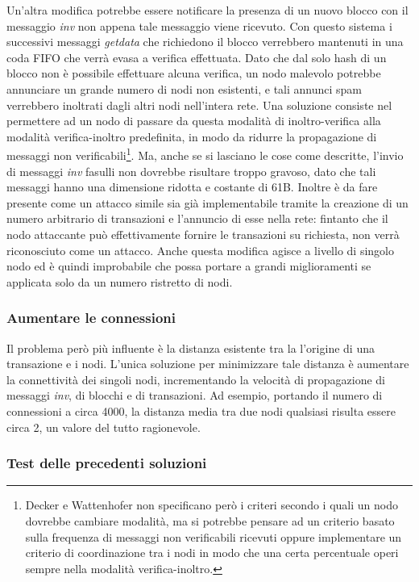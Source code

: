 Un'altra modifica potrebbe essere notificare la presenza di un nuovo blocco con il messaggio \emph{inv} non appena tale messaggio viene ricevuto. Con questo sistema i successivi messaggi \emph{getdata} che richiedono il blocco verrebbero mantenuti in una coda FIFO che verrà evasa a verifica effettuata.
Dato che dal solo hash di un blocco non è possibile effettuare alcuna verifica, un nodo malevolo potrebbe annunciare un grande numero di nodi non esistenti, e tali annunci spam verrebbero inoltrati dagli altri nodi nell'intera rete. Una soluzione consiste nel permettere ad un nodo di passare da questa modalità di inoltro-verifica alla modalità verifica-inoltro predefinita, in modo da ridurre la propagazione di messaggi non verificabili\footnote{Decker e Wattenhofer non specificano però i criteri secondo i quali un nodo dovrebbe cambiare modalità, ma si potrebbe pensare ad un criterio basato sulla frequenza di messaggi non verificabili ricevuti oppure implementare un criterio di coordinazione tra i nodi in modo che una certa percentuale operi sempre nella modalità verifica-inoltro.}.
Ma, anche se si lasciano le cose come descritte, l'invio di messaggi \emph{inv} fasulli non dovrebbe risultare troppo gravoso, dato che tali messaggi hanno una dimensione ridotta e costante di 61B.
Inoltre è da fare presente come un attacco simile sia già implementabile tramite la creazione di un numero arbitrario di transazioni e l'annuncio di esse nella rete: fintanto che il nodo attaccante può effettivamente fornire le transazioni su richiesta, non verrà riconosciuto come un attacco.
Anche questa modifica agisce a livello di singolo nodo ed è quindi improbabile che possa portare a grandi miglioramenti se applicata solo da un numero ristretto di nodi.

\subsubsection{Aumentare le connessioni}

Il problema però più influente è la distanza esistente tra la l'origine di una transazione e i nodi. L'unica soluzione per minimizzare tale distanza è aumentare la connettività dei singoli nodi, incrementando la velocità di propagazione di messaggi \emph{inv}, di blocchi e di transazioni. Ad esempio, portando il numero di connessioni a circa 4000, la distanza media tra due nodi qualsiasi risulta essere circa 2, un valore del tutto ragionevole.

\subsubsection{Test delle precedenti soluzioni}

